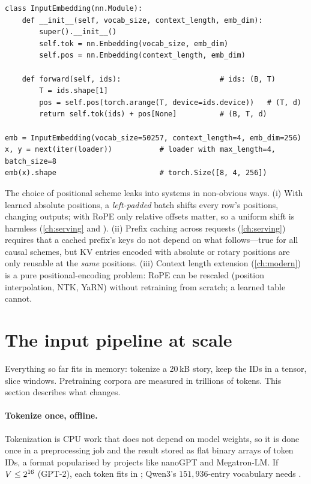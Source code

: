 \begin{lstlisting}[caption={The complete input layer of GPT-2 (Lab 3, Part E).},label={lst:text:inputemb}]
class InputEmbedding(nn.Module):
    def __init__(self, vocab_size, context_length, emb_dim):
        super().__init__()
        self.tok = nn.Embedding(vocab_size, emb_dim)
        self.pos = nn.Embedding(context_length, emb_dim)

    def forward(self, ids):                       # ids: (B, T)
        T = ids.shape[1]
        pos = self.pos(torch.arange(T, device=ids.device))   # (T, d)
        return self.tok(ids) + pos[None]          # (B, T, d)

emb = InputEmbedding(vocab_size=50257, context_length=4, emb_dim=256)
x, y = next(iter(loader))           # loader with max_length=4, batch_size=8
emb(x).shape                        # torch.Size([8, 4, 256])
\end{lstlisting}

\begin{systemslens}
The choice of positional scheme leaks into systems in non-obvious ways.
(i) With learned absolute positions, a \emph{left-padded} batch shifts every row's positions,
changing outputs; with RoPE only relative offsets matter, so a uniform shift is harmless
(\cref{ch:serving} and ).
(ii) Prefix caching across requests (\cref{ch:serving}) requires that a cached prefix's keys do not
depend on what follows---true for all causal schemes, but KV entries encoded with absolute or
rotary positions are only reusable at the \emph{same} positions.
(iii) Context length extension (\cref{ch:modern}) is a pure positional-encoding problem: RoPE can be
rescaled (position interpolation, NTK, YaRN) without retraining from scratch; a learned table cannot.
\end{systemslens}

\section{The input pipeline at scale}\label{sec:text:pipeline}

Everything so far fits in memory: tokenize a 20\,kB story, keep the IDs in a tensor, slice windows.
Pretraining corpora are measured in trillions of tokens. This section describes what changes.

\paragraph{Tokenize once, offline.} Tokenization is CPU work that does not depend on model weights, so
it is done once in a preprocessing job and the result stored as flat binary arrays of token IDs,
a format popularised by projects like nanoGPT and Megatron-LM. If $V\le 2^{16}$ (GPT-2), each
token fits in ; Qwen3's $151{,}936$-entry vocabulary needs .

